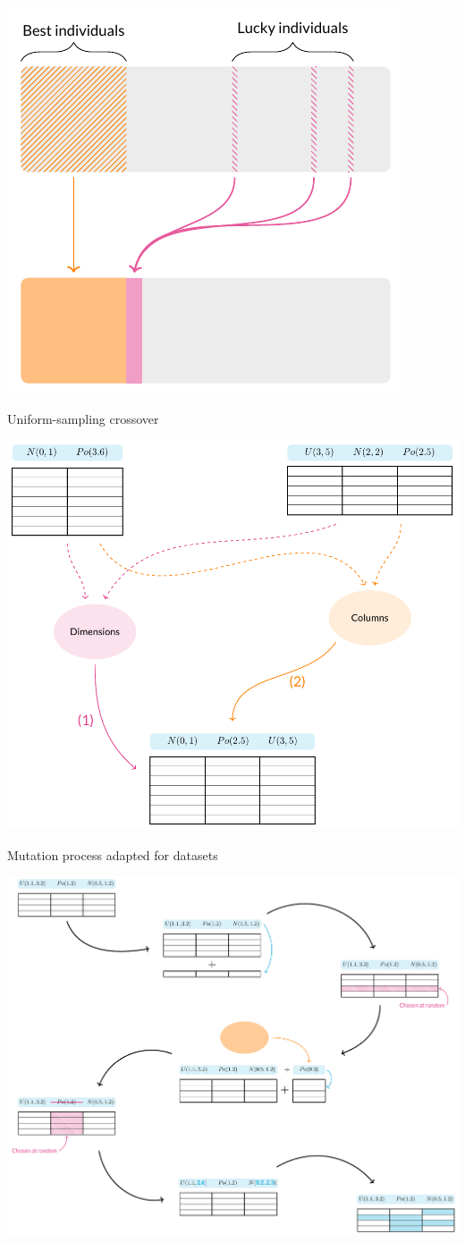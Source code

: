 \documentclass{betterposter}
\begin{document}
{\vspace{.75ex}\begin{center}
    \includegraphics[width=.65\linewidth]{tex/selection.pdf}
\end{center}

Uniform-sampling crossover

\vspace{.75ex}\begin{center}
    \includegraphics[width=.8\linewidth]{tex/crossover.pdf}
\end{center}

Mutation process adapted for datasets

\vspace{.75ex}\begin{center}
    \includegraphics[width=.9\linewidth]{tex/mutation.pdf}
\end{center}
}
\end{document}
